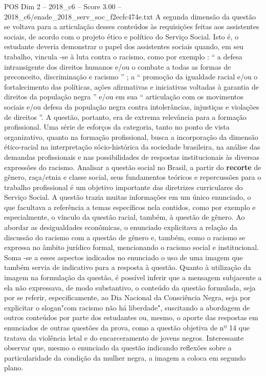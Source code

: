 \begin{textsample}{POS Dim 2 – 2018\_c6 – Score 3.00 – 2018\_c6/enade\_2018\_serv\_soc\_f2ecfc474e.txt}
A segunda dimensão da questão se voltava para a articulação desses conteúdos às requisições feitas aos assistentes sociais, de acordo com o projeto ético e político do Serviço Social.
Isto é, o estudante deveria demonstrar o papel dos assistentes sociais quando, em seu trabalho, vincula -se à luta contra o racismo, como por exemplo : “ a defesa intransigente dos direitos humanos e/ou o combate a todas as formas de preconceito, discriminação e racismo ” ; a “ promoção da igualdade racial e/ou o fortalecimento das políticas, ações afirmativas e iniciativas voltadas à garantia de direitos da população negra ” e/ou em sua “ articulação com os movimentos sociais e/ou defesa da população negra contra intolerâncias, injustiças e violações de direitos ”.
A questão, portanto, era de extrema relevância para a formação profissional.
Uma série de esforços da categoria, tanto no ponto de vista organizativo, quanto na formação profissional, busca a incorporação da dimensão ético-racial na interpretação sócio-histórica da sociedade brasileira, na análise das demandas profissionais e nas possibilidades de respostas institucionais às diversas expressões do racismo.
Analisar a questão social no Brasil, a partir do \textbf{recorte} de gênero, raça/etnia e classe social, seus fundamentos teóricos e repercussões para o trabalho profissional é um objetivo importante das diretrizes curriculares do Serviço Social.
A questão trazia muitas informações em um único enunciado, o que facultava a referência a temas específicos nela contidos, como por exemplo e especialmente, o vínculo da questão racial, também, à questão de gênero.
Ao abordar as desigualdades econômicas, o enunciado explicitava a relação da discussão do racismo com a questão de gênero e, também, como o racismo se expressa no âmbito jurídico formal, mencionando o racismo social e institucional.
Soma -se a esses aspectos indicados no enunciado o uso de uma imagem que também servia de indicativo para a resposta à questão.
Quanto à utilização da imagem na formulação da questão, é possível inferir que a mensagem subjacente a ela não expressava, de modo substantivo, o conteúdo da questão formulada, seja por se referir, especificamente, ao Dia Nacional da Consciência Negra, seja por explicitar o slogan"com racismo não há liberdade", suscitando a abordagem de outros conteúdos por parte dos estudantes ou, mesmo, o aporte das respostas em enunciados de outras questões da prova, como a questão objetiva de nº 14 que tratava da violência letal e do encarceramento de jovens negros.
Interessante observar que, mesmo o enunciado da questão indicando reflexões sobre a particularidade da condição da mulher negra, a imagem a coloca em segundo plano.

\end{textsample}
